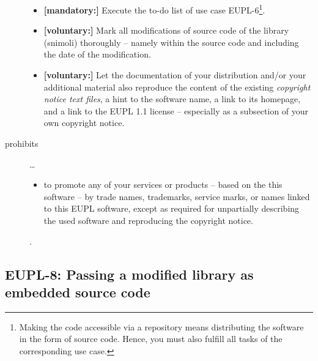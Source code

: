 \begin{description}
\begin{itemize}
  \item \textbf{[mandatory:]} Execute the to-do list of use case EUPL-6\footnote{
  Making the code accessible via a repository means distributing the software in
  the form of source code. Hence, you must also fulfill all tasks of the
  corresponding use case.}.
    
  \item \textbf{[voluntary:]} Mark all modifications of source code of the
  library (snimoli) thoroughly -- namely within the source code and including
  the date of the modification.
  
  \item \textbf{[voluntary:]} Let the documentation of your distribution and/or
  your additional material  also reproduce the content of the existing
  \emph{copyright notice text files}, a hint to the software name, a link to its
  homepage, and a link to the EUPL 1.1 license -- especially as a subsection of
  your own copyright notice.
  
\end{itemize}

\item[prohibits] \ldots
\begin{itemize}
  \item to promote any of your services or products – based on the this software
  – by trade names, trademarks, service marks, or names linked to this EUPL
  software, except as required for unpartially describing the used software and
  reproducing the copyright notice.
\end{itemize}.

\end{description}

\subsection{EUPL-8: Passing a modified library as embedded source code}
\label{OSUC-10-EUPL}

